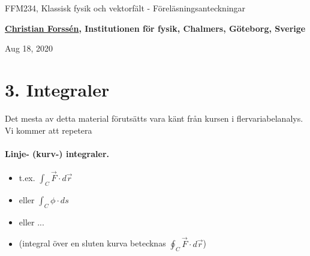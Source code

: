 \documentclass[%
oneside,                 %
final,                   %
10pt]{article}
\begin{document}

\newcommand{\exercisesection}[1]{\subsection*{#1}}







\thispagestyle{empty}

\begin{center}
{\LARGE\bf
\begin{spacing}{1.25}
FFM234, Klassisk fysik och vektorfält - Föreläsningsanteckningar
\end{spacing}
}
\end{center}


\begin{center}
{\bf \href{{http://fy.chalmers.se/subatom/tsp/}}{Christian Forssén}, Institutionen för fysik, Chalmers, Göteborg, Sverige${}^{}$} \\ [0mm]
\end{center}

\begin{center}
\end{center}
    

\begin{center}
Aug 18, 2020
\end{center}

\vspace{1cm}


\section*{3. Integraler}
Det mesta av detta material förutsätts vara känt från kursen i flervariabelanalys. Vi kommer att repetera
\paragraph{Linje- (kurv-) integraler.}
\begin{itemize}
\item t.ex. $\int_C \vec{F} \cdot d\vec{r}$

\item eller $\int_C \phi \cdot ds$

\item eller ...

\item (integral över en sluten kurva betecknas $\oint_C \vec{F} \cdot d\vec{r}$)
\end{itemize}
\end{document}
